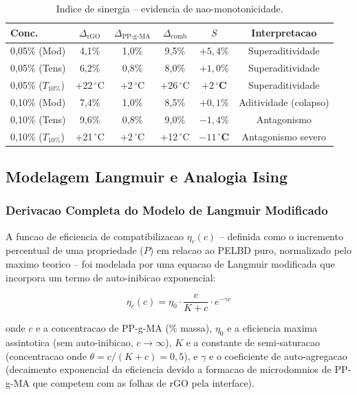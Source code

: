 \documentclass[11pt,a4paper,oneside]{article}
\begin{document}
\begin{table}[H]\centering
\caption{Indice de sinergia -- evidencia de nao-monotonicidade.}\label{tab:sinergia}
\begin{tabular}{lccccc}
\toprule
{\bfseries Conc.} & {\bfseries $\Delta_{\text{rGO}}$} & {\bfseries $\Delta_{\text{PP-g-MA}}$} & {\bfseries $\Delta_{\text{comb}}$} & {\bfseries $S$} & {\bfseries Interpretacao} \\
\midrule
0,05\% (Mod)    & 4,1\% & 1,0\%  & 9,5\%  & {\bfseries $+5{,}4\%$} & Superaditividade \\
0,05\% (Tens)   & 6,2\% & 0,8\%  & 8,0\%  & {\bfseries $+1{,}0\%$} & Superaditividade \\
0,05\% ($T_{10\%}$) & +22\,$^{\circ}$C & +2\,$^{\circ}$C & +26\,$^{\circ}$C & {\bfseries $+2\,^{\circ}$C} & Superaditividade \\
0,10\% (Mod)    & 7,4\% & 1,0\%  & 8,5\%  & {\bfseries $+0{,}1\%$} & Aditividade (colapso) \\
0,10\% (Tens)   & 9,6\% & 0,8\%  & 9,0\%  & {\bfseries $-1{,}4\%$} & Antagonismo \\
0,10\% ($T_{10\%}$) & +21\,$^{\circ}$C & +2\,$^{\circ}$C & +12\,$^{\circ}$C & {\bfseries $-11\,^{\circ}$C} & Antagonismo severo \\
\bottomrule
\end{tabular}
\end{table}

\subsection{Modelagem Langmuir e Analogia Ising}\label{sec:langmuir}

\subsubsection{Derivacao Completa do Modelo de Langmuir Modificado}

A funcao de eficiencia de compatibilizacao $\eta_c(c)$ -- definida como o incremento percentual de uma propriedade ($P$) em relacao ao PELBD puro, normalizado pelo maximo teorico -- foi modelada por uma equacao de Langmuir modificada que incorpora um termo de auto-inibicao exponencial:

\begin{equation}
\eta_c(c) = \eta_0 \cdot \frac{c}{K + c} \cdot e^{-\gamma c}
\label{eq:langmuir_completa}
\end{equation}

onde $c$ e a concentracao de PP-g-MA (\% massa), $\eta_0$ e a eficiencia maxima assintotica (sem auto-inibicao, $c{\to}\infty$), $K$ e a constante de semi-saturacao (concentracao onde $\theta{=}c/(K{+}c){=}0{,}5$), e $\gamma$ e o coeficiente de auto-agregacao (decaimento exponencial da eficiencia devido a formacao de microdomnios de PP-g-MA que competem com as folhas de rGO pela interface).
\end{document}
